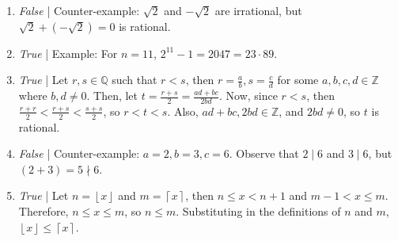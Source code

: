 \documentclass[a4paper,12pt]{article}
\newcommand{\floor}[1]{\left\lfloor #1 \right\rfloor}
\newcommand{\ceil}[1]{\left\lceil #1 \right\rceil}
\begin{document}
\begin{enumerate}
\item {\em False} | Counter-example: $\sqrt{2}$ and $-\sqrt{2}$ are irrational,
but $\sqrt{2} + (-\sqrt{2}) = 0$ is rational.
\item {\em True} | Example: For $n = 11$, $2^{11} - 1 = 2047 = 23 \cdot 89$.
\item {\em True} | Let $r, s \in \mathbb{Q}$ such that $r < s$, then $r = \frac{a}{b},
s = \frac{c}{d}$ for some $a, b, c, d \in \mathbb{Z}$ where $b, d \neq 0$. Then,
let $t = \frac{r+s}{2} = \frac{ad + bc}{2bd}$. Now, since $r < s$, then
$\frac{r + r}{2} < \frac{r + s}{2} < \frac{s + s}{2}$, so $r < t < s$. Also,
$ad + bc, 2bd \in \mathbb{Z}$, and $2bd \neq 0$, so $t$ is rational.
\item {\em False} | Counter-example: $a = 2, b = 3, c = 6$. Observe that
$2 \mid 6$ and $3 \mid 6$, but $(2 + 3) = 5 \nmid 6$.
\item {\em True} | Let $n = \floor{x}$ and $m = \ceil{x}$, then $n \leq x < n + 1$
and $m-1 < x \leq m$. Therefore, $n \leq x \leq m$, so $n \leq m$. Substituting
in the definitions of $n$ and $m$, $\floor{x} \leq \ceil{x}$.
\end{enumerate}
\end{document}
